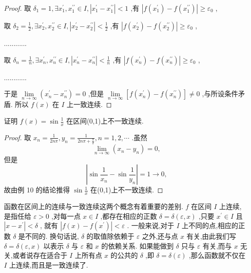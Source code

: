 \begin{proof}
取 \({\delta }_{1} = 1,\exists {x}_{1}^{\prime },{x}_{1}^{\prime \prime } \in  I,\left| {{x}_{1}^{\prime } - {x}_{1}^{\prime \prime }}\right|  < 1\) ,有 \(\left| {f\left( {x}_{1}^{\prime }\right)  - f\left( {x}_{1}^{\prime \prime }\right) }\right|  \geq  {\varepsilon }_{0}\) ,

取 \({\delta }_{2} = \frac{1}{2},\exists {x}_{2}^{\prime },{x}_{2}^{\prime \prime } \in  I,\left| {{x}_{2}^{\prime } - {x}_{2}^{\prime \prime }}\right|  < \frac{1}{2}\) ,有 \(\left| {f\left( {x}_{2}^{\prime }\right)  - f\left( {x}_{2}^{\prime \prime }\right) }\right|  \geq  {\varepsilon }_{0}\) ,

............

取 \({\delta }_{n} = \frac{1}{n},\exists {x}_{n}^{\prime },{x}_{n}^{\prime \prime } \in  I,\left| {{x}_{n}^{\prime } - {x}_{n}^{\prime \prime }}\right|  < \frac{1}{n}\) ,有 \(\left| {f\left( {x}_{n}^{\prime }\right)  - f\left( {x}_{n}^{\prime \prime }\right) }\right|  \geq  {\varepsilon }_{0}\) ,

............

于是 \(\mathop{\lim }\limits_{{n \rightarrow  \infty }}\left( {{x}_{n}^{\prime } - {x}_{n}^{\prime \prime }}\right)  = 0\) ,但是 \(\mathop{\lim }\limits_{{n \rightarrow  \infty }}\left\lbrack  {f\left( {x}_{n}^{\prime }\right)  - f\left( {x}_{n}^{\prime \prime }\right) }\right\rbrack   \neq  0\) ,与所设条件矛盾. 所以 \(f\left( x\right)\) 在 \(I\) 上一致连续.
\end{proof}

\begin{example}
证明 \(f\left( x\right)  = \sin \frac{1}{x}\) 在区间(0,1)上不一致连续.
\end{example}


\begin{proof}
取 \({x}_{n} = \frac{1}{2n\pi },{y}_{n} = \frac{1}{{2n\pi } + \frac{\pi }{2}},n = 1,2,\cdots\) .虽然
\[
\mathop{\lim }\limits_{{n \rightarrow  \infty }}\left( {{x}_{n} - {y}_{n}}\right)  = 0,
\]
但是
\[
\left| {\sin \frac{1}{{x}_{n}} - \sin \frac{1}{{y}_{n}}}\right|  = 1 \rightarrow  0,
\]
故由例 10 的结论推得 \(\sin \frac{1}{x}\) 在(0,1)上不一致连续.
\end{proof}

函数在区间上的连续与一致连续这两个概念有着重要的差别. \(f\) 在区间 \(I\) 上连续, 是指任给 \(\varepsilon  > 0\) ,对每一点 \(x \in  I\) ,都存在相应的正数 \(\delta  = \delta \left( {\varepsilon ,x}\right)\) ,只要 \({x}^{\prime } \in  I\) 且 \(\left| {x - {x}^{\prime }}\right|  < \delta\) , 就有 \(\left| {f\left( x\right)  - f\left( {x}^{\prime }\right) }\right|  < \varepsilon\) . 一般来说,对于 \(I\) 上不同的点,相应的正数 \(\delta\) 是不同的. 换句话说, \(\delta\) 的取值除依赖于 \(\varepsilon\) 之外,还与点 \(x\) 有关,由此我们写 \(\delta  = \delta \left( {\varepsilon ,x}\right)\) 以表示 \(\delta\) 与 \(\varepsilon\) 和 \(x\) 的依赖关系. 如果能做到 \(\delta\) 只与 \(\varepsilon\) 有关,而与 \(x\) 无关,或者说存在适合于 \(I\) 上所有点 \(x\) 的公共的 \(\delta\) ,即 \(\delta  = \delta \left( \varepsilon \right)\) ,那么函数就不仅在 \(I\) 上连续,而且是一致连续了.

